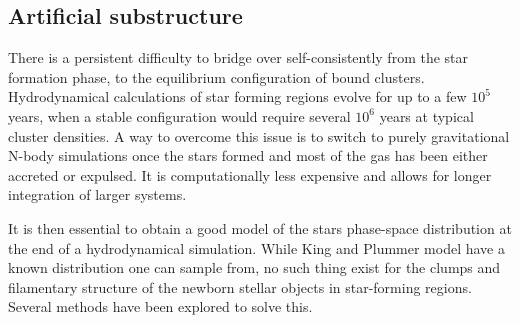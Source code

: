 \subsection{Artificial substructure}
\label{Sec:0_substructure}

There is a persistent difficulty to bridge over self-consistently from the star formation phase, to the equilibrium configuration of bound clusters. Hydrodynamical calculations of star forming regions evolve for  up to a few $10^5$ years, when a stable configuration would require several $10^6$ years at typical cluster densities. A way to overcome this issue is to switch to purely gravitational N-body simulations once the stars formed and most of the gas has been either accreted or expulsed. It is computationally less expensive and allows for longer integration of larger systems.

It is then essential to obtain a good model of the stars phase-space distribution at the end of a hydrodynamical simulation. While King and Plummer model have a known distribution one can sample from, no such thing exist for the clumps and filamentary structure of the newborn stellar objects in star-forming regions. Several methods have been explored to solve this.



